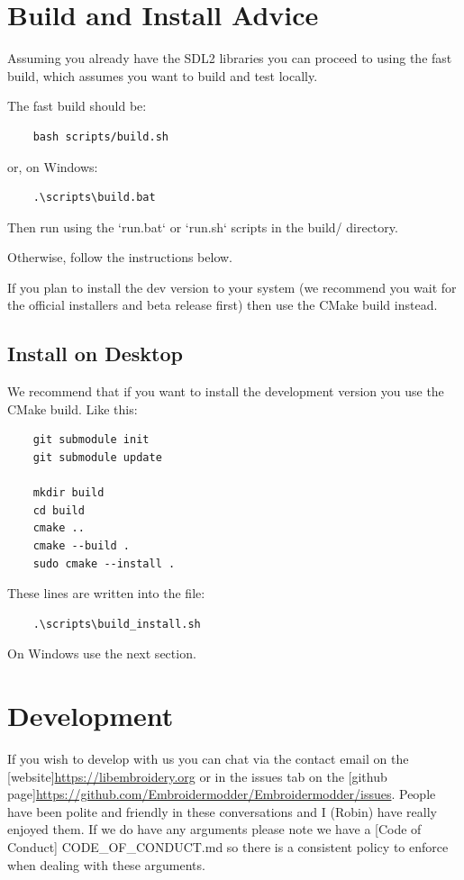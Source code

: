 \documentclass{report}
\begin{document}
\chapter{Build and Install Advice}

Assuming you already have the SDL2 libraries you can proceed to using the fast build, which assumes you want to build and test locally.

The fast build should be:

\begin{lstlisting}
    bash scripts/build.sh
\end{lstlisting}

or, on Windows:

\begin{lstlisting}
    .\scripts\build.bat
\end{lstlisting}

Then run using the `run.bat` or `run.sh` scripts in the build/ directory.

Otherwise, follow the instructions below.

If you plan to install the dev version to your system (we recommend you wait for the official installers and beta release first) then use the CMake build instead.

\section{Install on Desktop}

We recommend that if you want to install the development version you use the CMake build. Like this:

\begin{lstlisting}
    git submodule init
    git submodule update

    mkdir build
    cd build
    cmake ..
    cmake --build .
    sudo cmake --install .
\end{lstlisting}

These lines are written into the file:

\begin{lstlisting}
    .\scripts\build_install.sh
\end{lstlisting}

On Windows use the next section.

\chapter{Development}

If you wish to develop with us you can chat via the contact email
on the [website]\url{https://libembroidery.org} or in the issues tab on the
[github page]\url{https://github.com/Embroidermodder/Embroidermodder/issues}.
People have been polite and friendly in these conversations and I (Robin)
have really enjoyed them.
If we do have any arguments please note we have a
[Code of Conduct] CODE\_OF\_CONDUCT.md so there is a consistent policy to
enforce when dealing with these arguments.
\end{document}
